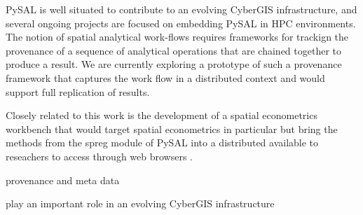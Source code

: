 \documentclass[11pt, titlepage]{article}
\begin{document}
PySAL is well situated to contribute to an evolving CyberGIS
infrastructure, and several ongoing projects are focused on embedding
PySAL in HPC environments. The notion of spatial analytical work-flows
requires frameworks for trackign the provenance of a sequence of
analytical operations that are chained together to produce a result. We
are currently exploring a prototype of such a provenance framework that
captures the work flow in a distributed context and would support full
replication of results.

Closely related to this work is the development of a spatial
econometrics workbench \citep{Anselin:2011wt} that would target spatial econometrics in
particular but bring the methods from the spreg module of PySAL into a
distributed available to reseachers to access through web browsers .

provenance and meta data

play an important role in an evolving CyberGIS infrastructure


%

\end{document}
